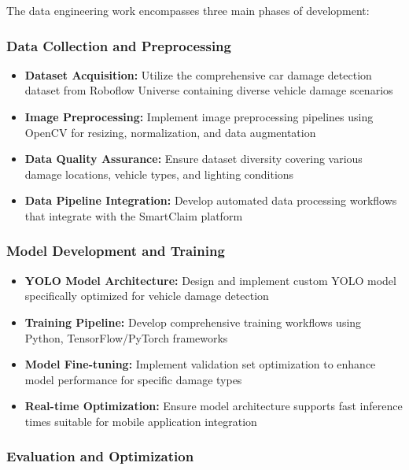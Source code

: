 \documentclass[12pt,a4paper]{report}
\begin{document}
The data engineering work encompasses three main phases of development:

\subsubsection{Data Collection and Preprocessing}

\begin{itemize}
    \item \textbf{Dataset Acquisition:} Utilize the comprehensive car damage detection dataset from Roboflow Universe containing diverse vehicle damage scenarios
    \item \textbf{Image Preprocessing:} Implement image preprocessing pipelines using OpenCV for resizing, normalization, and data augmentation
    \item \textbf{Data Quality Assurance:} Ensure dataset diversity covering various damage locations, vehicle types, and lighting conditions
    \item \textbf{Data Pipeline Integration:} Develop automated data processing workflows that integrate with the SmartClaim platform
\end{itemize}

\subsubsection{Model Development and Training}

\begin{itemize}
    \item \textbf{YOLO Model Architecture:} Design and implement custom YOLO model specifically optimized for vehicle damage detection
    \item \textbf{Training Pipeline:} Develop comprehensive training workflows using Python, TensorFlow/PyTorch frameworks
    \item \textbf{Model Fine-tuning:} Implement validation set optimization to enhance model performance for specific damage types
    \item \textbf{Real-time Optimization:} Ensure model architecture supports fast inference times suitable for mobile application integration
\end{itemize}

\subsubsection{Evaluation and Optimization}
\end{document}
